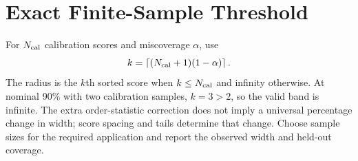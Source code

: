 \section{Exact Finite-Sample Threshold}
\label{sec:finite-sample-limits}
For $N_{\rm cal}$ calibration scores and miscoverage $\alpha$, use
\begin{equation}
 k=\left\lceil(N_{\rm cal}+1)(1-\alpha)\right\rceil.
\end{equation}
The radius is the $k$th sorted score when $k\le N_{\rm cal}$ and infinity
otherwise. At nominal 90\% with two calibration samples, $k=3>2$, so the
valid band is infinite. The extra order-statistic correction does not imply
a universal percentage change in width; score spacing and tails determine
that change. Choose sample sizes for the required application and report the
observed width and held-out coverage.
